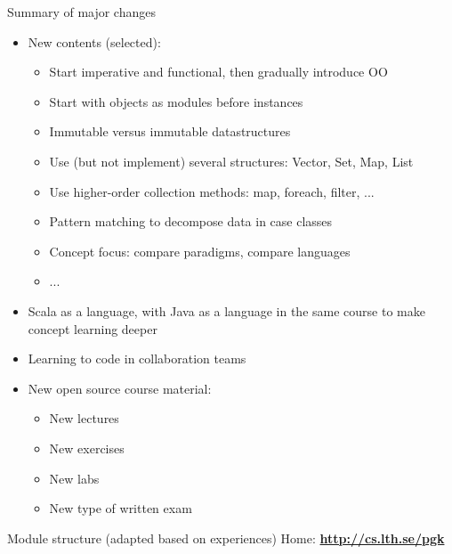 \documentclass{lecturenotes}
\begin{document}
\begin{Slide}{Summary of major changes}\footnotesize
\begin{itemize}
\item New contents (selected):
\begin{itemize}\footnotesize
\item Start imperative and functional, then gradually introduce OO
\item Start with objects as modules before instances
\item Immutable versus immutable datastructures
\item Use (but not implement) several structures: Vector, Set, Map, List
\item Use higher-order collection methods: map, foreach, filter, ...
\item Pattern matching to decompose data in case classes
\item Concept focus: compare paradigms, compare languages
\item ...
\end{itemize}
\item Scala as a  language, with Java as a  language in the same course to make concept learning deeper
\item Learning to code in collaboration teams
\item New open source course material:
\begin{itemize}\footnotesize
\item New lectures
\item New exercises
\item New labs
\item New type of written exam
\end{itemize}
\end{itemize}
\end{Slide}

\begin{Slide}{Module structure (adapted based on experiences)}
Home: \textbf{\url{http://cs.lth.se/pgk}} \\ \vspace{1em}

\noindent\resizebox{0.8\columnwidth}{!}{\fontsize{8}{10}\selectfont

}
\end{Slide}
\end{document}
